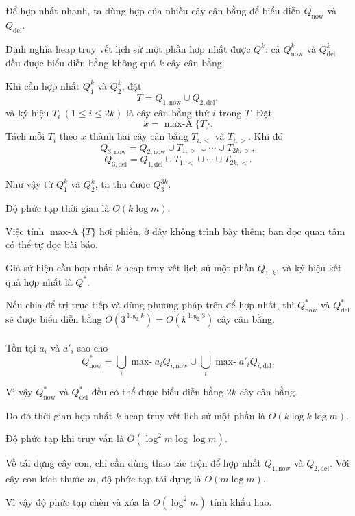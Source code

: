 \documentclass[11pt]{article}
\begin{document}
Để hợp nhất nhanh, ta dùng hợp của nhiều cây cân bằng để biểu diễn
\(Q_{\mathrm{now}}\) và \(Q_{\mathrm{del}}\).

Định nghĩa heap truy vết lịch sử một phần hợp nhất được \(Q^k\): cả
\(Q^k_{\mathrm{now}}\) và \(Q^k_{\mathrm{del}}\) đều được biểu diễn bằng không
quá \(k\) cây cân bằng.

Khi cần hợp nhất \(Q_1^k\) và \(Q_2^k\), đặt
\[
T=Q_{1,\mathrm{now}}\cup Q_{2,\mathrm{del}},
\]
và ký hiệu \(T_i\ (1\le i\le 2k)\) là cây cân bằng thứ \(i\) trong \(T\). Đặt
\[
x=\operatorname{max-A}\{T\}.
\]
Tách mỗi \(T_i\) theo \(x\) thành hai cây cân bằng \(T_{i,<}\) và \(T_{i,>}\).
Khi đó
\[
Q_{3,\mathrm{now}}
=Q_{2,\mathrm{now}}\cup T_{1,>}\cup\cdots\cup T_{2k,>},
\]
\[
Q_{3,\mathrm{del}}
=Q_{1,\mathrm{del}}\cup T_{1,<}\cup\cdots\cup T_{2k,<}.
\]

Như vậy từ \(Q_1^k\) và \(Q_2^k\), ta thu được \(Q_3^{3k}\).

Độ phức tạp thời gian là \(O(k\log m)\).

Việc tính \(\operatorname{max-A}\{T\}\) hơi phiền, ở đây không trình bày thêm;
bạn đọc quan tâm có thể tự đọc bài báo.

Giả sử hiện cần hợp nhất \(k\) heap truy vết lịch sử một phần \(Q_{1..k}\), và
ký hiệu kết quả hợp nhất là \(Q^*\).

Nếu chia để trị trực tiếp và dùng phương pháp trên để hợp nhất, thì
\(Q^*_{\mathrm{now}}\) và \(Q^*_{\mathrm{del}}\) sẽ được biểu diễn bằng
\(O(3^{\log_2 k})=O(k^{\log_2 3})\) cây cân bằng.

\paragraph{}
Tồn tại \(a_i\) và \(a'_i\) sao cho
\[
Q^*_{\mathrm{now}}
=\bigcup_i \operatorname{max-}a_i Q_{i,\mathrm{now}}
\cup
\bigcup_i \operatorname{max-}a'_i Q_{i,\mathrm{del}}.
\]

Vì vậy \(Q^*_{\mathrm{now}}\) và \(Q^*_{\mathrm{del}}\) đều có thể được biểu
diễn bằng \(2k\) cây cân bằng.

Do đó thời gian hợp nhất \(k\) heap truy vết lịch sử một phần là
\(O(k\log k\log m)\).

Độ phức tạp khi truy vấn là \(O(\log^2 m\log\log m)\).

Về tái dựng cây con, chỉ cần dùng thao tác trộn để hợp nhất
\(Q_{1,\mathrm{now}}\) và \(Q_{2,\mathrm{del}}\). Với cây con kích thước
\(m\), độ phức tạp tái dựng là \(O(m\log m)\).

Vì vậy độ phức tạp chèn và xóa là \(O(\log^2 m)\) tính khấu hao.
\end{document}

